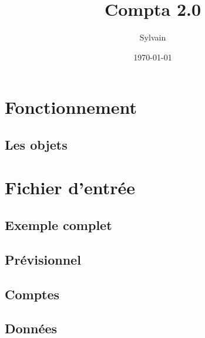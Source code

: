 \documentclass[a4paper,french]{report}
\begin{document}
\author{Sylvain}
\date{\today}
\title{Compta 2.0}

\maketitle

\tableofcontents
\newpage



\chapter{Fonctionnement}
\label{chap:func}
\section{Les objets}

\label{sec:object}

\chapter{Fichier d'entrée}
\section{Exemple complet}

\section{Prévisionnel}

\section{Comptes}
\section{Données}
\end{document}
